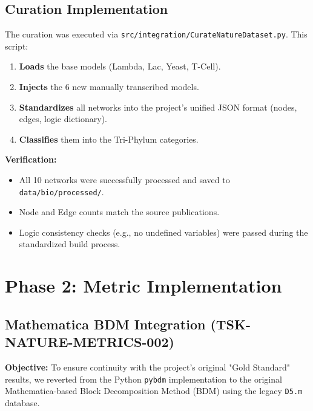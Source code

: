 \documentclass{article}
\begin{document}
\subsection{Curation Implementation}
The curation was executed via \texttt{src/integration/CurateNatureDataset.py}. This script:
\begin{enumerate}
    \item \textbf{Loads} the base models (Lambda, Lac, Yeast, T-Cell).
    \item \textbf{Injects} the 6 new manually transcribed models.
    \item \textbf{Standardizes} all networks into the project's unified JSON format (nodes, edges, logic dictionary).
    \item \textbf{Classifies} them into the Tri-Phylum categories.
\end{enumerate}

\textbf{Verification:}
\begin{itemize}
    \item All 10 networks were successfully processed and saved to \texttt{data/bio/processed/}.
    \item Node and Edge counts match the source publications.
    \item Logic consistency checks (e.g., no undefined variables) were passed during the standardized build process.
\end{itemize}

\section{Phase 2: Metric Implementation}

\subsection{Mathematica BDM Integration (TSK-NATURE-METRICS-002)}
\textbf{Objective:} To ensure continuity with the project's original "Gold Standard" results, we reverted from the Python \texttt{pybdm} implementation to the original Mathematica-based Block Decomposition Method (BDM) using the legacy \texttt{D5.m} database.
\end{document}
